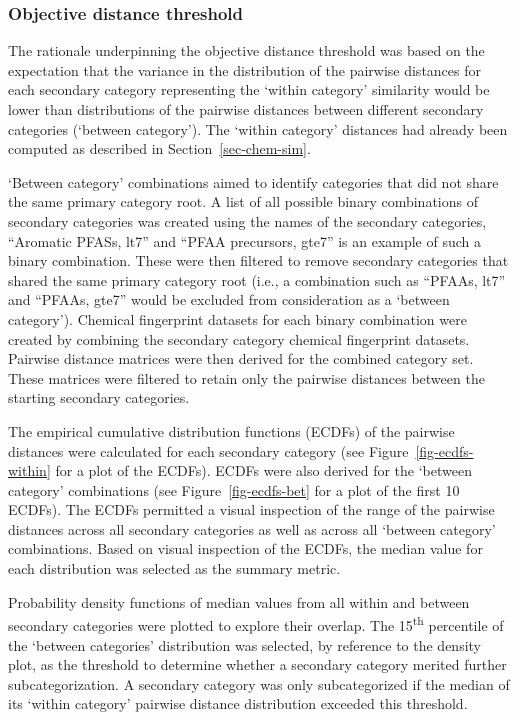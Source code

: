 \documentclass[
  super,
  preprint,
  3p]{elsarticle}
\begin{document}
\hypertarget{sec-objective-threshold}{%
\subsubsection{Objective distance
threshold}\label{sec-objective-threshold}}

The rationale underpinning the objective distance threshold was based on
the expectation that the variance in the distribution of the pairwise
distances for each secondary category representing the `within category'
similarity would be lower than distributions of the pairwise distances
between different secondary categories (`between category'). The `within
category' distances had already been computed as described in
Section~\ref{sec-chem-sim}.

`Between category' combinations aimed to identify categories that did
not share the same primary category root. A list of all possible binary
combinations of secondary categories was created using the names of the
secondary categories, ``Aromatic PFASs, lt7'' and ``PFAA precursors,
gte7'' is an example of such a binary combination. These were then
filtered to remove secondary categories that shared the same primary
category root (i.e., a combination such as ``PFAAs, lt7'' and ``PFAAs,
gte7'' would be excluded from consideration as a `between category').
Chemical fingerprint datasets for each binary combination were created
by combining the secondary category chemical fingerprint datasets.
Pairwise distance matrices were then derived for the combined category
set. These matrices were filtered to retain only the pairwise distances
between the starting secondary categories.

The empirical cumulative distribution functions (ECDFs) of the pairwise
distances were calculated for each secondary category (see
Figure~\ref{fig-ecdfs-within} for a plot of the ECDFs). ECDFs were also
derived for the `between category' combinations (see
Figure~\ref{fig-ecdfs-bet} for a plot of the first 10 ECDFs). The ECDFs
permitted a visual inspection of the range of the pairwise distances
across all secondary categories as well as across all `between category'
combinations. Based on visual inspection of the ECDFs, the median value
for each distribution was selected as the summary metric.

Probability density functions of median values from all within and
between secondary categories were plotted to explore their overlap. The
15\textsuperscript{th} percentile of the `between categories'
distribution was selected, by reference to the density plot, as the
threshold to determine whether a secondary category merited further
subcategorization. A secondary category was only subcategorized if the
median of its `within category' pairwise distance distribution exceeded
this threshold.
\end{document}
